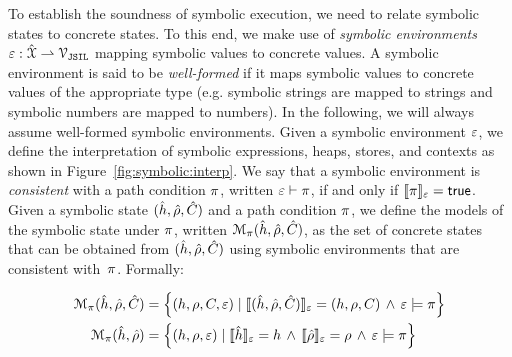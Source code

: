 \vspace{-5pt}
 To establish the soundness of symbolic execution, we need to relate 
symbolic states to concrete states. To this end, we make use of \emph{symbolic environments} 
$\varepsilon : \hat{\mathcal{X}} \rightharpoonup \mathcal{V}_{\mathtt{JSIL}}$ mapping symbolic values to concrete values. 
A symbolic environment is said to be \emph{well-formed} if it maps symbolic 
values to concrete values of the appropriate type (e.g. symbolic strings are mapped to strings 
and symbolic numbers are mapped to numbers). In the following, we will always 
assume well-formed symbolic environments. 
%
Given a symbolic environment $\varepsilon$, we define the interpretation of symbolic 
expressions, heaps, stores, and contexts as shown in Figure~\ref{fig:symbolic:interp}. 
We say that a symbolic environment is \emph{consistent} with a path condition 
$\pi$, written $\varepsilon \vdash \pi$,  if and only if $\llbracket \pi \rrbracket_{\varepsilon} = {\sf true}$. 
Given a symbolic state $(\hat{h}, \hat\rho, \hat{C})$ and a path condition $\pi$, we define 
the models of the symbolic state under $\pi$, written $\mathcal{M}_{\pi}(\hat{h}, \hat\rho, \hat{C})$, 
as the set of concrete states that can be obtained from $(\hat{h}, \hat\rho, \hat{C})$ using 
symbolic environments that are consistent with~$\pi$. Formally:

{\small \begin{align}
\mathcal{M}_{\pi}(\hat{h}, \hat\rho, \hat{C}) & = \left\{ (h, \rho, C, \varepsilon) \mid \llbracket (\hat{h}, \hat\rho, \hat{C}) \rrbracket_{\varepsilon} = (h, \rho, C) \, \wedge \,  \varepsilon \models \pi  \right\} \\
\mathcal{M}_{\pi}(\hat{h}, \hat\rho) & = \left\{ (h, \rho, \varepsilon) \mid \llbracket \hat{h} \rrbracket_{\varepsilon} = h \, \wedge \, \llbracket \hat\rho \rrbracket_{\varepsilon} = \rho \, \wedge \,  \varepsilon \models \pi  \right\}
\end{align}}

